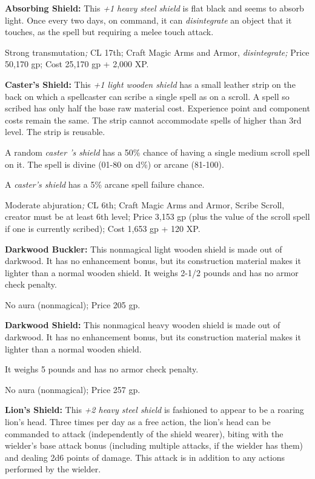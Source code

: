 \documentclass{article}
\begin{document}
\textbf{Absorbing Shield:} This \textit{+1 heavy steel shield }is flat black and 
seems to absorb light. Once every two days, on command, it can \textit{disintegrate 
}an object that it touches, as the spell but requiring a melee touch attack.

Strong transmutation\textit{; }CL 17th; Craft Magic Arms and Armor, \textit{disintegrate; 
}Price 50,170 gp; Cost 25,170 gp + 2,000 XP.

\textbf{Caster's Shield:} This \textit{+1 light wooden shield }has a small leather 
strip on the back on which a spellcaster can scribe a single spell as on a scroll. 
A spell so scribed has only half the base raw material cost. Experience point and 
component costs remain the same. The strip cannot accommodate spells of higher 
than 3rd level. The strip is reusable.

A random \textit{caster 's shield }has a 50\% chance of having a single medium 
scroll spell on it. The spell is divine (01-80 on d\%) or arcane (81-100).

A \textit{caster's shield }has a 5\% arcane spell failure chance.

Moderate abjuration\textit{; }CL 6th; Craft Magic Arms and Armor, Scribe Scroll, 
creator must be at least 6th level; Price 3,153 gp (plus the value of the scroll 
spell if one is currently scribed); Cost 1,653 gp + 120 XP.

\textbf{Darkwood Buckler: }This nonmagical light wooden shield is made out of darkwood. 
It has no enhancement bonus, but its construction material makes it lighter than 
a normal wooden shield. It weighs 2-1/2 pounds and has no armor check penalty.

No aura (nonmagical); Price 205 gp.

\textbf{Darkwood Shield:} This nonmagical heavy wooden shield is made out of darkwood. 
It has no enhancement bonus, but its construction material makes it lighter than 
a normal wooden shield.

It weighs 5 pounds and has no armor check penalty.

No aura (nonmagical); Price 257 gp.

\textbf{Lion's Shield:} This \textit{+2 heavy steel shield }is fashioned to appear 
to be a roaring lion's head. Three times per day as a free action, the lion's head 
can be commanded to attack (independently of the shield wearer), biting with the 
wielder's base attack bonus (including multiple attacks, if the wielder has them) 
and dealing 2d6 points of damage. This attack is in addition to any actions performed 
by the wielder.
\end{document}
